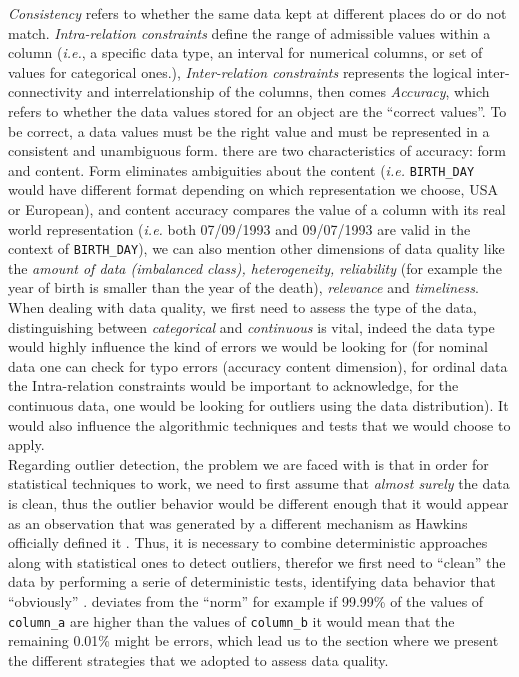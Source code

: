\documentclass{article}
\begin{document}
\textit{Consistency} refers to whether the same data kept at different places do or do not match. \textit{Intra-relation constraints} define the range of admissible values within a column (\textit{i.e.}, a specific data type, an interval for numerical columns, or set of values for categorical ones.), \textit{Inter-relation constraints} represents the logical inter-connectivity and interrelationship of the columns, then comes \textit{Accuracy}, which refers to whether the data values stored for an object are the ``correct values''. To be correct, a data values must be the right value and must be represented in a consistent and unambiguous form. there are two characteristics of accuracy: form and content. Form eliminates ambiguities about the content (\textit{i.e.} \texttt{BIRTH\_DAY} would have different format depending on which representation we choose, USA or European), and content accuracy compares the value of a column with its real world representation (\textit{i.e.} both 07/09/1993 and 09/07/1993 are valid in the context of \texttt{BIRTH\_DAY}), we can also mention other dimensions of data quality like the \textit{amount of data (imbalanced class), heterogeneity, reliability} (for example the year of birth is smaller than the year of the death), \textit{relevance} and \textit{timeliness}. \\
When dealing with data quality, we first need to assess the type of the data, distinguishing between \textit{categorical} and \textit{continuous} is vital, indeed the data type would highly influence the kind of errors we would be looking for (for nominal data one can check for typo errors (accuracy content dimension), for ordinal data the Intra-relation constraints would be important to acknowledge, for the continuous data, one would be looking for outliers using the data distribution). It would also influence the algorithmic techniques and tests that we would choose to apply. \\
Regarding outlier detection, the problem we are faced with is that in order for statistical techniques to work, we need to first assume that
\textit{almost surely}
the data is clean, thus the outlier behavior would be different enough that it would appear as an observation that was generated by a different mechanism as Hawkins officially defined it \cite{Hawking}.
Thus, it is necessary to combine deterministic approaches along with statistical ones to detect outliers, therefor we first need to ``clean'' the data by performing a serie of deterministic tests, identifying data behavior that ``obviously'' .
deviates from the ``norm'' for example if 99.99\% of the values of \texttt{column\_a} are higher than the values of \texttt{column\_b} it would mean that the remaining 0.01\% might be errors, which lead us to the section where we present the different strategies that we adopted to assess data quality.
\end{document}
